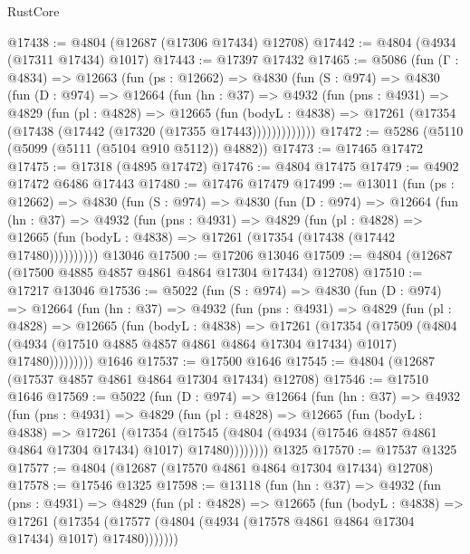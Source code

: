 \begin{lexlean}{RustCore}
\begin{coremodule}
@17438 := @4804 (@12687 (@17306 @17434) @12708)
@17442 := @4804 (@4934 (@17311 @17434) @1017)
@17443 := @17397 @17432
@17465 := @5086
    (fun (Γ : @4834) =>
    @12663
      (fun (ps : @12662) =>
      @4830
        (fun (S : @974) =>
        @4830
          (fun (D : @974) =>
          @12664
            (fun (hn : @37) =>
            @4932
              (fun (pns : @4931) =>
              @4829
                (fun (pl : @4828) =>
                @12665
                  (fun (bodyL : @4838) =>
                  @17261 (@17354 (@17438 (@17442 (@17320 (@17355 @17443)))))))))))))
@17472 := @5286 (@5110 (@5099 (@5111 (@5104 @910 @5112)) @4882))
@17473 := @17465 @17472
@17475 := @17318 (@4895 @17472)
@17476 := @4804 @17475
@17479 := @4902 @17472 @6486 @17443
@17480 := @17476 @17479
@17499 := @13011
    (fun (ps : @12662) =>
    @4830
      (fun (S : @974) =>
      @4830
        (fun (D : @974) =>
        @12664
          (fun (hn : @37) =>
          @4932
            (fun (pns : @4931) =>
            @4829
              (fun (pl : @4828) =>
              @12665 (fun (bodyL : @4838) => @17261 (@17354 (@17438 (@17442 @17480))))))))))
    @13046
@17500 := @17206 @13046
@17509 := @4804 (@12687 (@17500 @4885 @4857 @4861 @4864 @17304 @17434) @12708)
@17510 := @17217 @13046
@17536 := @5022
    (fun (S : @974) =>
    @4830
      (fun (D : @974) =>
      @12664
        (fun (hn : @37) =>
        @4932
          (fun (pns : @4931) =>
          @4829
            (fun (pl : @4828) =>
            @12665
              (fun (bodyL : @4838) =>
              @17261
                (@17354
                  (@17509
                    (@4804
                      (@4934 (@17510 @4885 @4857 @4861 @4864 @17304 @17434) @1017)
                      @17480)))))))))
    @1646
@17537 := @17500 @1646
@17545 := @4804 (@12687 (@17537 @4857 @4861 @4864 @17304 @17434) @12708)
@17546 := @17510 @1646
@17569 := @5022
    (fun (D : @974) =>
    @12664
      (fun (hn : @37) =>
      @4932
        (fun (pns : @4931) =>
        @4829
          (fun (pl : @4828) =>
          @12665
            (fun (bodyL : @4838) =>
            @17261
              (@17354
                (@17545 (@4804 (@4934 (@17546 @4857 @4861 @4864 @17304 @17434) @1017) @17480))))))))
    @1325
@17570 := @17537 @1325
@17577 := @4804 (@12687 (@17570 @4861 @4864 @17304 @17434) @12708)
@17578 := @17546 @1325
@17598 := @13118
    (fun (hn : @37) =>
    @4932
      (fun (pns : @4931) =>
      @4829
        (fun (pl : @4828) =>
        @12665
          (fun (bodyL : @4838) =>
          @17261
            (@17354 (@17577 (@4804 (@4934 (@17578 @4861 @4864 @17304 @17434) @1017) @17480)))))))

\end{coremodule}
\end{lexlean}

